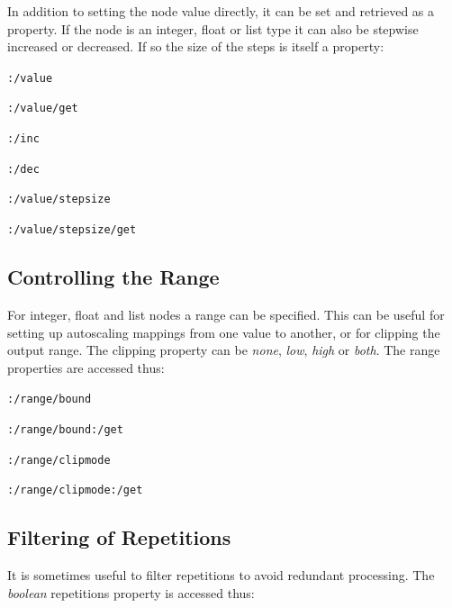 \documentclass{NIME-alternate}
\begin{document}
\begin{Abstract}
In addition to setting the node value directly, it can be set and retrieved as a property. If the node is an integer, float or list type it can also be stepwise increased or decreased. If so the size of the steps is itself a property:

\texttt{:/value}

\texttt{:/value/get}

\texttt{:/inc}

\texttt{:/dec} 

\texttt{:/value/stepsize}

\texttt{:/value/stepsize/get}





\subsection{Controlling the Range} %
\label{sub:range}

For integer, float and list nodes a range can be specified. This can be useful for setting up autoscaling mappings from one value to another, or for clipping the output range. The clipping property can be \emph{none}, \emph{low}, \emph{high} or \emph{both}. The range properties are accessed thus:

\texttt{:/range/bound}

\texttt{:/range/bound:/get}

\texttt{:/range/clipmode}

\texttt{:/range/clipmode:/get}





\subsection{Filtering of Repetitions} %
\label{sub:filtering_of_repetitions}

It is sometimes useful to filter repetitions to avoid redundant processing. The \emph{boolean} repetitions property is accessed thus:


\end{Abstract}
\end{document}
